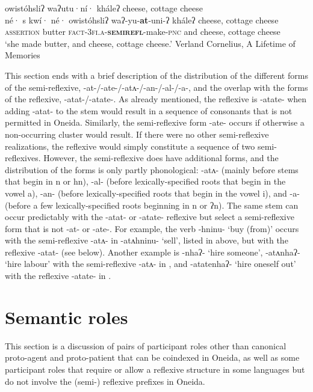 \documentclass[output=paper]{langscibook}
\begin{document}
\ea%
    \label{ex:oneida:25}
    {owistóhsliʔ} {waʔutu·ní·} {kháleʔ} {cheese,} {cottage} {cheese} \\
   {né·} {s} {kwí·} {né·} {owistóhsliʔ} waʔ-yu-\textbf{at}-uni-ʔ {kháleʔ} {cheese,} {cottage} {cheese} \\
    \textsc{assertion} butter \textsc{fact-3fi.a-}\textbf{\textsc{semirefl}}-make\textsc{-pnc} and cheese, cottage cheese\\
    \glt   ‘she made butter, and cheese, cottage cheese.’ Verland Cornelius, {A} {Lifetime} {of} {Memories}
\z

This section ends with a brief description of the distribution of the different forms of the semi-reflexive, {-at-/-ate-/-atʌ-/-an-/-al-/-a-}, and the overlap with the forms of the re\-flexive, {{}-atat-/-atate-}. As already mentioned, the reflexive is {-atate-} when adding {{}-atat-} to the stem would result in a sequence of consonants that is not permitted in Oneida. Similarly, the semi-reflexive form {-ate-} occurs if otherwise a non-occurring cluster would result. If there were no other semi-reflexive realizations, the reflexive would simply constitute a sequence of two semi-reflexives. However, the semi-reflexive does have additional forms, and the distribution of the forms is only partly phonological: {-atʌ-} (mainly before stems that begin in {n} or {hn}), {-al-} (before lexically-specified roots that begin in the vowel {a}), {-an-} (before lexically-specified roots that begin in the vowel {i}), and {-a-} (before a few lexically-specified roots beginning in {n} or {ʔn}). The same stem can occur predictably with the {-atat-} or {{}-atate-} reflexive but select a semi-reflexive form that is not {{}-at-} or {{}-ate-}. For example, the verb {-hninu-} ‘buy (from)’ occurs with the semi-reflexive {-atʌ-} in {{}-atʌhninu-} ‘sell’, listed in  above, but with the reflexive {{}-atat-} (see  below). Another example is {{}-nhaʔ-} ‘hire someone’, {{}-atʌnhaʔ-} ‘hire labour’ with the semi-reflexive {{}-atʌ-} in , and {{}-atatenhaʔ-} ‘hire oneself out’ with the reflexive {{}-atate-} in .

\section{Semantic roles}\label{sec:oneida:5}

This section is a discussion of pairs of participant roles other than canonical proto-agent and proto-patient that can be coindexed in Oneida, as well as some participant roles that require or allow a reflexive structure in some languages but do not involve the (semi-) reflexive prefixes in Oneida.
\end{document}
